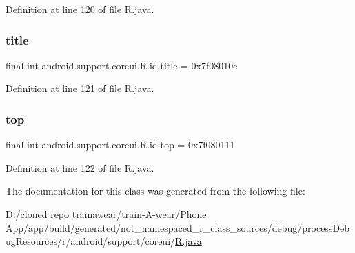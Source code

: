 Definition at line 120 of file R.\+java.

\mbox{\label{classandroid_1_1support_1_1coreui_1_1_r_1_1id_acd9ab7fdae28f0ae11ffbf38849039fa}} 
\subsubsection{\texorpdfstring{title}{title}}
{\footnotesize\ttfamily final int android.\+support.\+coreui.\+R.\+id.\+title = 0x7f08010e\hspace{0.3cm}{\ttfamily [static]}}



Definition at line 121 of file R.\+java.

\mbox{\label{classandroid_1_1support_1_1coreui_1_1_r_1_1id_ad51af01ed4af4016a2cfc10b83f10eff}} 
\subsubsection{\texorpdfstring{top}{top}}
{\footnotesize\ttfamily final int android.\+support.\+coreui.\+R.\+id.\+top = 0x7f080111\hspace{0.3cm}{\ttfamily [static]}}



Definition at line 122 of file R.\+java.



The documentation for this class was generated from the following file\+:\begin{DoxyCompactItemize}
\item 
D\+:/cloned repo trainawear/train-\/\+A-\/wear/\+Phone App/app/build/generated/not\+\_\+namespaced\+\_\+r\+\_\+class\+\_\+sources/debug/process\+Debug\+Resources/r/android/support/coreui/\mbox{\hyperlink{process_debug_resources_2r_2android_2support_2coreui_2_r_8java}{R.\+java}}\end{DoxyCompactItemize}

